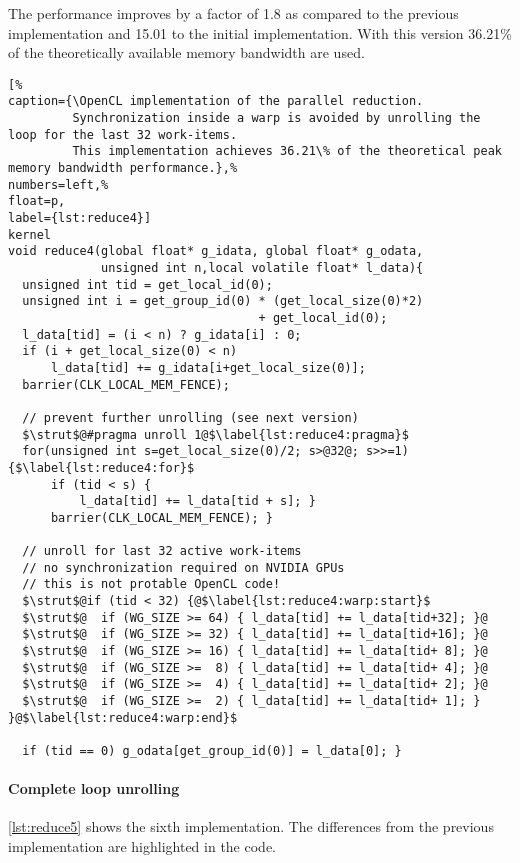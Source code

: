 The performance improves by a factor of 1.8 as compared to the previous implementation and 15.01 to the initial implementation.
With this version 36.21\% of the theoretically available memory bandwidth are used.

\begin{lstlisting}[%                                                             
caption={\OpenCL implementation of the parallel reduction.
         Synchronization inside a warp is avoided by unrolling the loop for the last 32 work-items.
         This implementation achieves 36.21\% of the theoretical peak memory bandwidth performance.},%
numbers=left,%
float=p,
label={lst:reduce4}]
kernel
void reduce4(global float* g_idata, global float* g_odata,
             unsigned int n,local volatile float* l_data){
  unsigned int tid = get_local_id(0);
  unsigned int i = get_group_id(0) * (get_local_size(0)*2)
                                   + get_local_id(0);
  l_data[tid] = (i < n) ? g_idata[i] : 0;
  if (i + get_local_size(0) < n) 
      l_data[tid] += g_idata[i+get_local_size(0)];  
  barrier(CLK_LOCAL_MEM_FENCE);

  // prevent further unrolling (see next version)
  $\strut$@#pragma unroll 1@$\label{lst:reduce4:pragma}$
  for(unsigned int s=get_local_size(0)/2; s>@32@; s>>=1) {$\label{lst:reduce4:for}$
      if (tid < s) {
          l_data[tid] += l_data[tid + s]; }
      barrier(CLK_LOCAL_MEM_FENCE); }

  // unroll for last 32 active work-items
  // no synchronization required on NVIDIA GPUs
  // this is not protable OpenCL code!
  $\strut$@if (tid < 32) {@$\label{lst:reduce4:warp:start}$
  $\strut$@  if (WG_SIZE >= 64) { l_data[tid] += l_data[tid+32]; }@
  $\strut$@  if (WG_SIZE >= 32) { l_data[tid] += l_data[tid+16]; }@
  $\strut$@  if (WG_SIZE >= 16) { l_data[tid] += l_data[tid+ 8]; }@
  $\strut$@  if (WG_SIZE >=  8) { l_data[tid] += l_data[tid+ 4]; }@
  $\strut$@  if (WG_SIZE >=  4) { l_data[tid] += l_data[tid+ 2]; }@
  $\strut$@  if (WG_SIZE >=  2) { l_data[tid] += l_data[tid+ 1]; } }@$\label{lst:reduce4:warp:end}$

  if (tid == 0) g_odata[get_group_id(0)] = l_data[0]; }
\end{lstlisting}

\paragraph{Complete loop unrolling}

\autoref{lst:reduce5} shows the sixth implementation.
The differences from the previous implementation are highlighted in the code.

